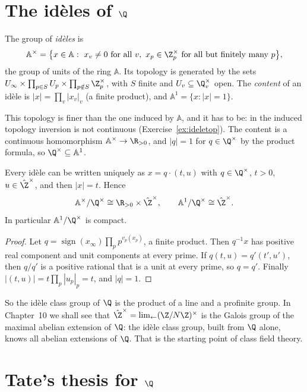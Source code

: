 \section{The id\`eles of \texorpdfstring{$\Q$}{Q}}

\begin{definition}
The group of \emph{id\`eles} is
\[
\mathbb{A}^\times=\bigl\{x\in\mathbb{A}:\ x_v\ne0\text{ for all }v,\ x_p\in\Z_p^\times\text{ for all but finitely many }p\bigr\},
\]
the group of units of the ring $\mathbb{A}$. Its topology is generated by the sets $U_\infty\times\prod_{p\in S}U_p\times\prod_{p\notin S}\Z_p^\times$, with
$S$ finite and $U_v\subseteq\Q_v^\times$ open. The \emph{content} of an id\`ele is $|x|=\prod_v|x_v|_v$ (a finite product), and
$\mathbb{A}^1=\{x:|x|=1\}$.
\end{definition}

This topology is finer than the one induced by $\mathbb{A}$, and it has to be: in the induced topology inversion is not continuous
(Exercise~\ref{ex:ideletop}). The content is a continuous homomorphism $\mathbb{A}^\times\to\R_{>0}$, and $|q|=1$ for $q\in\Q^\times$ by the product
formula, so $\Q^\times\subseteq\mathbb{A}^1$.

\begin{proposition}\label{prop:ideleQ}
Every id\`ele can be written uniquely as $x=q\cdot(t,u)$ with $q\in\Q^\times$, $t>0$, $u\in\hat{\Z}^\times$, and then $|x|=t$. Hence
\[
\mathbb{A}^\times/\Q^\times\cong\R_{>0}\times\hat{\Z}^\times,\qquad \mathbb{A}^1/\Q^\times\cong\hat{\Z}^\times.
\]
In particular $\mathbb{A}^1/\Q^\times$ is compact.
\end{proposition}
\begin{proof}
Let $q=\operatorname{sign}(x_\infty)\prod_pp^{v_p(x_p)}$, a finite product. Then $q^{-1}x$ has positive real component and unit components
at every prime. If $q(t,u)=q'(t',u')$, then $q/q'$ is a positive rational that is a unit at every prime, so $q=q'$. Finally
$|(t,u)|=t\prod_p|u_p|_p=t$, and $|q|=1$.
\end{proof}

So the id\`ele class group of $\Q$ is the product of a line and a profinite group. In Chapter~10 we shall see that
$\hat{\Z}^\times=\lim_{\leftarrow}(\Z/N\Z)^\times$ is the Galois group of the maximal abelian extension of $\Q$: the id\`ele class group, built from
$\Q$ alone, knows all abelian extensions of $\Q$. That is the starting point of class field theory.

\section{Tate's thesis for \texorpdfstring{$\Q$}{Q}}

